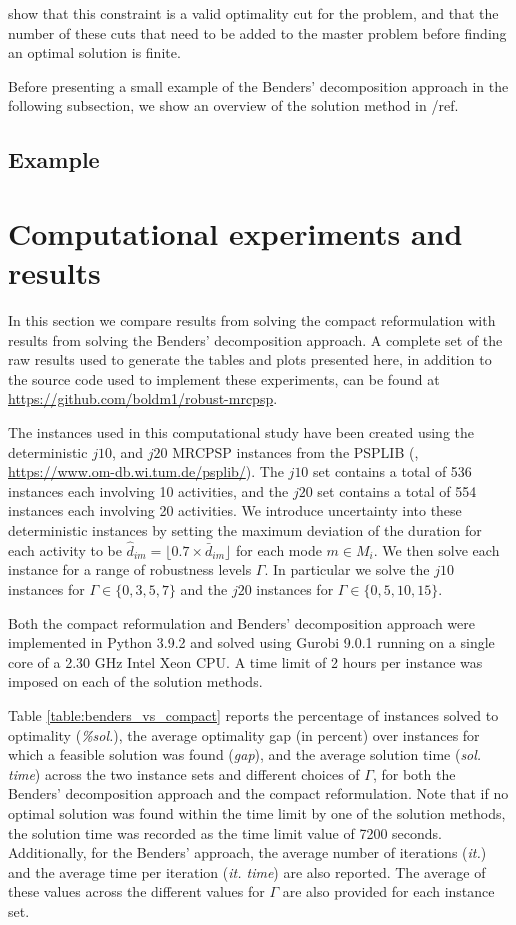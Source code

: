 \documentclass[a4paper,abstracton]{scrartcl}
\begin{document}
\cite{balouka2021robust} show that this constraint is a valid optimality cut for the problem, and that the number of these cuts that need to be added to the master problem before finding an optimal solution is finite.

Before presenting a small example of the Benders' decomposition approach in the following subsection, we show an overview of the solution method in /ref. 

\subsection{Example}

\section{Computational experiments and results}
 
In this section we compare results from solving the compact reformulation with results from solving the Benders' decomposition approach. A complete set of the raw results used to generate the tables and plots presented here, in addition to the source code used to implement these experiments, can be found at \url{https://github.com/boldm1/robust-mrcpsp}.

The instances used in this computational study have been created using the deterministic $j10$, and $j20$ MRCPSP instances from the PSPLIB (\cite{kolisch1997psplib}, \url{https://www.om-db.wi.tum.de/psplib/}). The $j10$ set contains a total of 536 instances each involving 10 activities, and the $j20$ set contains a total of 554 instances each involving 20 activities. We introduce uncertainty into these deterministic instances by setting the maximum deviation of the duration for each activity to be $\hat{d}_{im}=\lfloor0.7\times \bar{d}_{im}\rfloor$ for each mode $m\in M_i$. We then solve each instance for a range of robustness levels $\Gamma$. In particular we solve the $j10$ instances for $\Gamma\in\{0,3,5,7\}$ and the $j20$ instances for $\Gamma\in\{0,5,10,15\}$. 

Both the compact reformulation and Benders' decomposition approach were implemented in Python 3.9.2 and solved using Gurobi 9.0.1 running on a single core of a 2.30 GHz Intel Xeon CPU. A time limit of 2 hours per instance was imposed on each of the solution methods.

Table \ref{table:benders_vs_compact} reports the percentage of instances solved to optimality (\textit{\%sol.}), the average optimality gap (in percent) over instances for which a feasible solution was found (\textit{gap}), and the average solution time (\textit{sol. time}) across the two instance sets and different choices of $\Gamma$, for both the Benders' decomposition approach and the compact reformulation. Note that if no optimal solution was found within the time limit by one of the solution methods, the solution time was recorded as the time limit value of 7200 seconds. Additionally, for the Benders' approach, the average number of iterations (\textit{it.}) and the average time per iteration (\textit{it. time}) are also reported. The average of these values across the different values for $\Gamma$ are also provided for each instance set.
\end{document}
